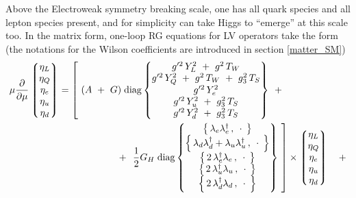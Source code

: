 \documentclass[12pt]{revtex4}
\newcommand{\p}{\partial}
\begin{document}
	Above the Electroweak symmetry breaking scale, one has all
	quark species and all lepton species present, and for
	simplicity can take Higgs to ``emerge'' at this scale too.
	In the matrix form, one-loop RG equations for LV operators take the
	form
	(the notations for the Wilson coefficients are introduced in 
	section \ref{matter_SM})
\begin{align}
\notag
	\mu \frac{\p}{\p\mu} 
		\left \lgroup 
			\begin{matrix}
				\eta_L \\
			   	\eta_Q \\
				\eta_e \\
				\eta_u \\
				\eta_d
			\end{matrix} 
		\right \rgroup & =
	\left[~
		( A ~+~ G )\;
		{\rm diag}
		\begin{Bmatrix}
			g'^2\, Y_L^2  ~+~  g^2\, T_W  \\
			g'^2\, Y_Q^2  ~+~  g^2\, T_W  ~+~  g_3^2\, T_S\\
			g'^2\, Y_e^2  \\
			g'^2\, Y_u^2  ~+~    g_3^2\, T_S \\
			g'^2\, Y_d^2  ~+~    g_3^2\, T_S \\
		\end{Bmatrix}
	\right.
		~+~~ \\
\notag
	&
	\left.
	\qquad\qquad\qquad+~~
		\frac{1}{2} G_H \;
		{\rm diag}
		\begin{Bmatrix}
		    \left\{\, \lambda_e \lambda_e^\dag  \,,\, \;\cdot\; \,\right\} \\
		    \left\{\, \lambda_d \lambda_d^\dag + 
					\lambda_u \lambda_u^\dag \,,\, \;\cdot\; \,\right\} \\
		    \left\{\, 2\,\lambda_e^\dag \lambda_e  \,,\, \;\cdot\; \,\right\} \\
		    \left\{\, 2\,\lambda_u^\dag \lambda_u  \,,\, \;\cdot\; \,\right\} \\
		    \left\{\, 2\,\lambda_d^\dag \lambda_d  \,,\, \;\cdot\; \,\right\} \\
		\end{Bmatrix}
	~\right] 
	\times
	\left\lgroup
	\begin{matrix}
		\eta_L \\
	   	\eta_Q \\
		\eta_e \\
		\eta_u \\
		\eta_d
	\end{matrix}
	\right\rgroup
	~~~+

\end{align}
\end{document}

